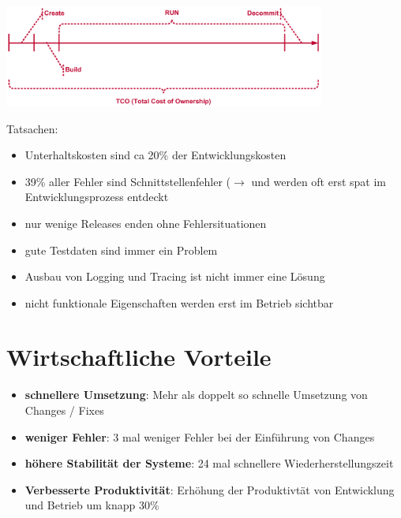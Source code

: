 \documentclass{report}
\newenvironment{Figure}
	{\par\medskip\noindent\minipage{\linewidth}}
	{\endminipage\par\medskip}
\theoremstyle{definition}
\theoremstyle{example}
\begin{document}
\begin{Figure}
\centering
\includegraphics[width=400px]{img/RelationDevOps.png}
	\label{fig:Die Relation zwischen Dev - Ops}
\end{Figure}

Tatsachen:
\begin{itemize}
	\item Unterhaltskosten sind ca 20\% der Entwicklungskosten
	\item 39\% aller Fehler sind Schnittstellenfehler ($\rightarrow$ und werden oft erst spat im Entwicklungsprozess entdeckt
	\item nur wenige Releases enden ohne Fehlersituationen
	\item gute Testdaten sind immer ein Problem
	\item Ausbau von Logging und Tracing ist nicht immer eine Lösung
	\item nicht funktionale Eigenschaften werden erst im Betrieb sichtbar
\end{itemize}

\section{Wirtschaftliche Vorteile}
\begin{itemize}
	\item \textbf{schnellere Umsetzung}: Mehr als doppelt so schnelle Umsetzung von Changes / Fixes
	\item \textbf{weniger Fehler}: 3 mal weniger Fehler bei der Einführung von Changes
	\item \textbf{höhere Stabilität der Systeme}: 24 mal schnellere Wiederherstellungszeit
	\item \textbf{Verbesserte Produktivität}: Erhöhung der Produktivtät von Entwicklung und Betrieb um knapp 30\%
\end{itemize}
\end{document}
